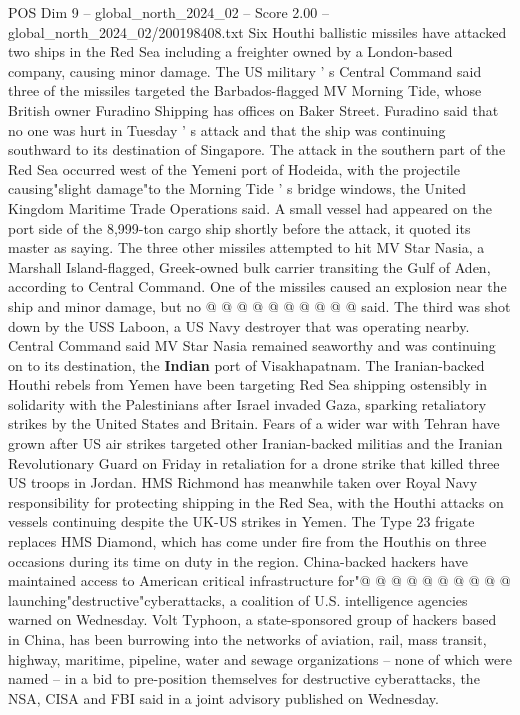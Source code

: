 \begin{textsample}{POS Dim 9 – global\_north\_2024\_02 – Score 2.00 – global\_north\_2024\_02/200198408.txt}  \label{ex:f9_pos_159}
Six Houthi ballistic missiles have attacked two ships in the Red Sea including a freighter owned by a London-based company, causing minor damage.
The US military ' s Central Command said three of the missiles targeted the Barbados-flagged MV Morning Tide, whose British owner Furadino Shipping has offices on Baker Street.
Furadino said that no one was hurt in Tuesday ' s attack and that the ship was continuing southward to its destination of Singapore.
The attack in the southern part of the Red Sea occurred west of the Yemeni port of Hodeida, with the projectile causing"slight damage"to the Morning Tide ' s bridge windows, the United Kingdom Maritime Trade Operations said.
A small vessel had appeared on the port side of the 8,999-ton cargo ship shortly before the attack, it quoted its master as saying.
The three other missiles attempted to hit MV Star Nasia, a Marshall Island-flagged, Greek-owned bulk carrier transiting the Gulf of Aden, according to Central Command.
One of the missiles caused an explosion near the ship and minor damage, but no @ @ @ @ @ @ @ @ @ @ said.
The third was shot down by the USS Laboon, a US Navy destroyer that was operating nearby.
Central Command said MV Star Nasia remained seaworthy and was continuing on to its destination, the \textbf{Indian} port of Visakhapatnam.
The Iranian-backed Houthi rebels from Yemen have been targeting Red Sea shipping ostensibly in solidarity with the Palestinians after Israel invaded Gaza, sparking retaliatory strikes by the United States and Britain.
Fears of a wider war with Tehran have grown after US air strikes targeted other Iranian-backed militias and the Iranian Revolutionary Guard on Friday in retaliation for a drone strike that killed three US troops in Jordan.
HMS Richmond has meanwhile taken over Royal Navy responsibility for protecting shipping in the Red Sea, with the Houthi attacks on vessels continuing despite the UK-US strikes in Yemen.
The Type 23 frigate replaces HMS Diamond, which has come under fire from the Houthis on three occasions during its time on duty in the region.
China-backed hackers have maintained access to American critical infrastructure for"@ @ @ @ @ @ @ @ @ @ launching"destructive"cyberattacks, a coalition of U.S. intelligence agencies warned on Wednesday.
Volt Typhoon, a state-sponsored group of hackers based in China, has been burrowing into the networks of aviation, rail, mass transit, highway, maritime, pipeline, water and sewage organizations -- none of which were named -- in a bid to pre-position themselves for destructive cyberattacks, the NSA, CISA and FBI said in a joint advisory published on Wednesday.

\end{textsample}
